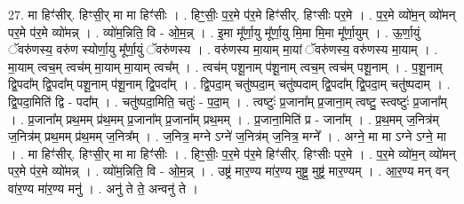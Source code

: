 \documentclass[17pt]{extarticle}
\begin{document}
27. मा हिꣳ॑सीर्. हिꣳसी॒र् मा मा हिꣳ॑सीः । . हिꣳ॒॒सीः॒ प॒र॒मे प॑र॒मे हिꣳ॑सीर्. हिꣳसीः पर॒मे । . प॒र॒मे व्यो॑म॒न् व्यो॑मन् पर॒मे प॑र॒मे व्यो॑मन्न् । . व्यो॑म॒न्निति॒ वि - ओ॒म॒न्न् । . इ॒मा मू᳚र्णा॒यु मू᳚र्णा॒यु मि॒मा मि॒मा मू᳚र्णा॒युम् । . ऊ॒र्णा॒युं ॅवरु॑णस्य॒ वरु॑ण स्योर्णा॒यु मू᳚र्णा॒युं ॅवरु॑णस्य । . वरु॑णस्य मा॒याम् मा॒यां ॅवरु॑णस्य॒ वरु॑णस्य मा॒याम् । . मा॒याम् त्वच॒म् त्वच॑म् मा॒याम् मा॒याम् त्वच᳚म् । . त्वच॑म् पशू॒नाम् प॑शू॒नाम् त्वच॒म् त्वच॑म् पशू॒नाम् । . प॒शू॒नाम् द्वि॒पदा᳚म् द्वि॒पदा᳚म् पशू॒नाम् प॑शू॒नाम् द्वि॒पदा᳚म् । . द्वि॒पदा॒म् चतु॑ष्पदा॒म् चतु॑ष्पदाम् द्वि॒पदा᳚म् द्वि॒पदा॒म् चतु॑ष्पदाम् । . द्वि॒पदा॒मिति॑ द्वि - पदा᳚म् । . चतु॑ष्पदा॒मिति॒ चतुः॑ - प॒दा॒म् । . त्वष्टुः॑ प्र॒जाना᳚म् प्र॒जाना॒म् त्वष्टु॒ स्त्वष्टुः॑ प्र॒जाना᳚म् । . प्र॒जाना᳚म् प्रथ॒मम् प्र॑थ॒मम् प्र॒जाना᳚म् प्र॒जाना᳚म् प्रथ॒मम् । . प्र॒जाना॒मिति॑ प्र - जाना᳚म् । . प्र॒थ॒मम् ज॒नित्र॑म् ज॒नित्र॑म् प्रथ॒मम् प्र॑थ॒मम् ज॒नित्र᳚म् । . ज॒नित्र॒ मग्ने ऽग्ने॑ ज॒नित्र॑म् ज॒नित्र॒ मग्ने᳚ । . अग्ने॒ मा मा ऽग्ने ऽग्ने॒ मा । . मा हिꣳ॑सीर्. हिꣳसी॒र् मा मा हिꣳ॑सीः । . हिꣳ॒॒सीः॒ प॒र॒मे प॑र॒मे हिꣳ॑सीर्. हिꣳसीः पर॒मे । . प॒र॒मे व्यो॑म॒न् व्यो॑मन् पर॒मे प॑र॒मे व्यो॑मन्न् । . व्यो॑म॒न्निति॒ वि - ओ॒म॒न्न् । . उष्ट्र॑ मार॒ण्य मा॑र॒ण्य मुष्ट्र॒ मुष्ट्र॑ मार॒ण्यम् । . आ॒र॒ण्य मन् वन् वा॑र॒ण्य मा॑र॒ण्य मनु॑ । . अनु॑ ते ते॒ अन्वनु॑ ते । \newline
\end{document}
